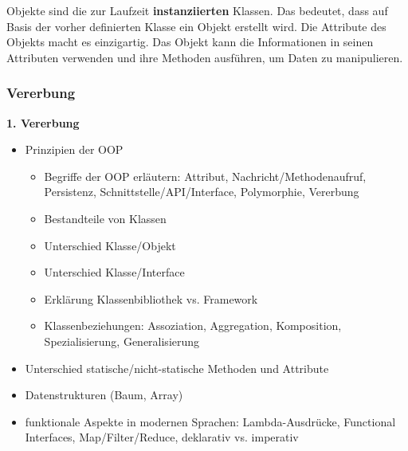 Objekte sind die zur Laufzeit \textbf{instanziierten} Klassen. Das bedeutet, dass auf Basis der vorher definierten Klasse ein Objekt erstellt wird. Die Attribute des Objekts macht es einzigartig. Das Objekt kann die Informationen in seinen Attributen verwenden und ihre Methoden ausführen, um Daten zu manipulieren.

\subsubsection{Vererbung}
\textbf{1. Vererbung}\\

\begin{itemize}
	\item Prinzipien der OOP
	\begin{itemize}
		\item Begriffe der OOP erläutern: Attribut, Nachricht/Methodenaufruf, Persistenz, Schnittstelle/API/Interface, Polymorphie, Vererbung
		\item Bestandteile von Klassen
		\item Unterschied Klasse/Objekt
		\item Unterschied Klasse/Interface
		\item Erklärung Klassenbibliothek vs. Framework
		\item Klassenbeziehungen: Assoziation, Aggregation, Komposition, Spezialisierung, Generalisierung
	\end{itemize}
	\item Unterschied statische/nicht-statische Methoden und Attribute
	\item Datenstrukturen (Baum, Array)
	\item funktionale Aspekte in modernen Sprachen: Lambda-Ausdrücke, Functional Interfaces, Map/Filter/Reduce, deklarativ vs. imperativ
\end{itemize}